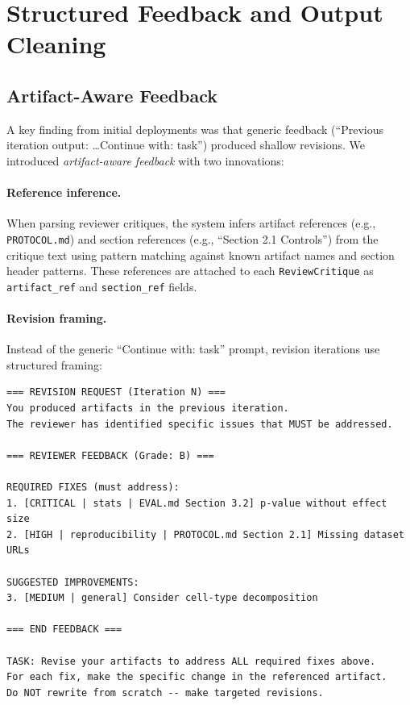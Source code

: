 \documentclass[11pt,a4paper]{article}
\begin{document}

\section{Structured Feedback and Output Cleaning}
\label{sec:feedback}

\subsection{Artifact-Aware Feedback}

A key finding from initial deployments was that generic feedback (``Previous iteration output: \ldots Continue with: task'') produced shallow revisions.
We introduced \emph{artifact-aware feedback} with two innovations:

\paragraph{Reference inference.}
When parsing reviewer critiques, the system infers artifact references (e.g., \texttt{PROTOCOL.md}) and section references (e.g., ``Section 2.1 Controls'') from the critique text using pattern matching against known artifact names and section header patterns.
These references are attached to each \texttt{ReviewCritique} as \texttt{artifact\_ref} and \texttt{section\_ref} fields.

\paragraph{Revision framing.}
Instead of the generic ``Continue with: task'' prompt, revision iterations use structured framing:

\begin{lstlisting}[caption={Revision prompt template injected for post-review iterations.}]
=== REVISION REQUEST (Iteration N) ===
You produced artifacts in the previous iteration.
The reviewer has identified specific issues that MUST be addressed.

=== REVIEWER FEEDBACK (Grade: B) ===

REQUIRED FIXES (must address):
1. [CRITICAL | stats | EVAL.md Section 3.2] p-value without effect size
2. [HIGH | reproducibility | PROTOCOL.md Section 2.1] Missing dataset URLs

SUGGESTED IMPROVEMENTS:
3. [MEDIUM | general] Consider cell-type decomposition

=== END FEEDBACK ===

TASK: Revise your artifacts to address ALL required fixes above.
For each fix, make the specific change in the referenced artifact.
Do NOT rewrite from scratch -- make targeted revisions.
\end{lstlisting}
\end{document}
